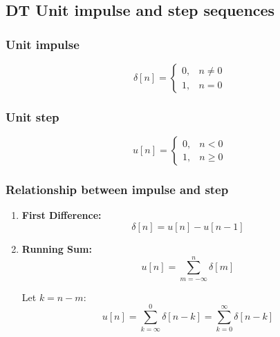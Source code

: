 \subsection{DT Unit impulse and step sequences}
    \subsubsection{Unit impulse}
    \begin{definition}
        \begin{equation}
            \delta[n] = 
            \begin{cases}
                0, & n \neq 0 \\
                1, & n = 0
            \end{cases}
        \end{equation}

    \end{definition}

    \subsubsection{Unit step}
    \begin{definition}
        \begin{equation}
            u[n] = 
            \begin{cases}
                0, & n < 0 \\
                1, & n \geq 0
            \end{cases}
        \end{equation}
    \end{definition}

    \subsubsection{Relationship between impulse and step}
    \begin{definition}
        \begin{enumerate}
            \item \textbf{First Difference:}
            \[
            \delta[n] = u[n] - u[n-1]
            \]
        
            \item \textbf{Running Sum:}
            \[
            u[n] = \sum_{m=-\infty}^{n} \delta[m]
            \]

            Let $k=n-m$:
            \[
            u[n] = \sum_{k=\infty}^{0} \delta[n-k] = \sum_{k=0}^{\infty} \delta[n-k]
            \]
        \end{enumerate}
    \end{definition}

